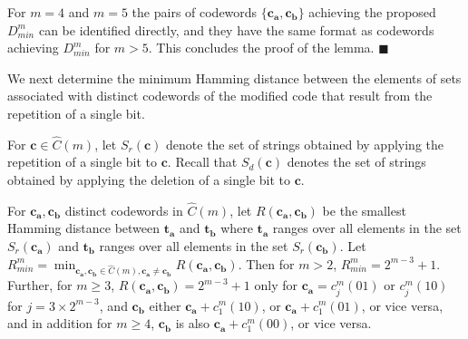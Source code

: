 
For $m=4$ and $m=5$ the pairs of codewords
$\{\mathbf{c_a},\mathbf{c_b}\}$ achieving the proposed $D_{min}^m$
can be identified directly, and they have the same format as
codewords achieving $D_{min}^m$ for $m > 5$. This concludes the
proof of the lemma. \hfill$\blacksquare$

We next determine the minimum Hamming distance between the
elements of sets associated with distinct codewords of the
modified code that result from the repetition of a single bit.

For $\mathbf{c} \in \hat{C}(m)$, let $S_r(\mathbf{c})$ denote the
set of strings obtained by applying the repetition of a single bit
to $\mathbf{c}$. Recall that $S_d(\mathbf{c})$ denotes the set of
strings obtained by applying the deletion of a single bit to
$\mathbf{c}$.

\begin{lemma}\label{LE1a}
For $\mathbf{c_a},\mathbf{c_b}$ distinct codewords in
$\hat{C}(m)$, let $R(\mathbf{c_a},\mathbf{c_b})$ be the smallest
Hamming distance between $\mathbf{t_a}$ and $\mathbf{t_b}$ where
$\mathbf{t_a}$ ranges over all elements in the set
$S_r(\mathbf{c_a})$ and $\mathbf{t_b}$ ranges over all elements in
the set $S_r(\mathbf{c_b})$. Let
$R_{min}^m=\min_{\mathbf{c_a},\mathbf{c_b} \in \hat{C}(m),
\mathbf{c_a}\neq \mathbf{c_b}} R(\mathbf{c_a},\mathbf{c_b})$. Then
for $m>2$, $R_{min}^m=2^{m-3}+1$. Further, for $m \ge 3$,
$R(\mathbf{c_a},\mathbf{c_b})=2^{m-3}+1$ only for
$\mathbf{c_a}=c_j^m(01)$ or $c_j^m(10)$ for $j=3 \times 2^{m-3}$,
and $\mathbf{c_b}$ either $\mathbf{c_a}+c_1^m(10)$, or
$\mathbf{c_a}+c_1^m(01)$, or vice versa, and in addition for $m
\geq 4$, $\mathbf{c_b}$ is also $\mathbf{c_a}+c_1^m(00)$, or vice
versa.
\end{lemma}


